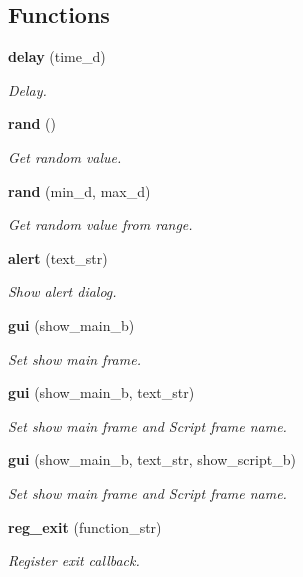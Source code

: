 \subsection*{Functions}
\begin{DoxyCompactItemize}
\item 
\textbf{ delay} (time\+\_\+d)
\begin{DoxyCompactList}\small\item\em Delay. \end{DoxyCompactList}\item 
\textbf{ rand} ()
\begin{DoxyCompactList}\small\item\em Get random value. \end{DoxyCompactList}\item 
\textbf{ rand} (min\+\_\+d, max\+\_\+d)
\begin{DoxyCompactList}\small\item\em Get random value from range. \end{DoxyCompactList}\item 
\textbf{ alert} (text\+\_\+str)
\begin{DoxyCompactList}\small\item\em Show alert dialog. \end{DoxyCompactList}\item 
\textbf{ gui} (show\+\_\+main\+\_\+b)
\begin{DoxyCompactList}\small\item\em Set show main frame. \end{DoxyCompactList}\item 
\textbf{ gui} (show\+\_\+main\+\_\+b, text\+\_\+str)
\begin{DoxyCompactList}\small\item\em Set show main frame and Script frame name. \end{DoxyCompactList}\item 
\textbf{ gui} (show\+\_\+main\+\_\+b, text\+\_\+str, show\+\_\+script\+\_\+b)
\begin{DoxyCompactList}\small\item\em Set show main frame and Script frame name. \end{DoxyCompactList}\item 
\textbf{ reg\+\_\+exit} (function\+\_\+str)
\begin{DoxyCompactList}\small\item\em Register exit callback. \end{DoxyCompactList}\end{DoxyCompactItemize}
